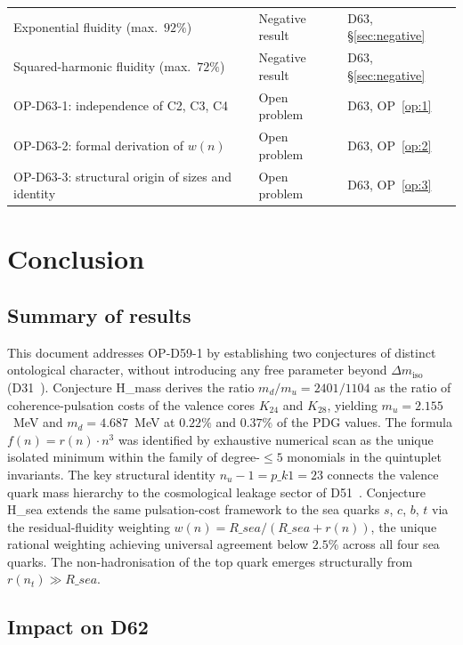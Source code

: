 \documentclass[12pt,a4paper]{article}
\def\Rsea{R\_sea}
\def\pkone{p\_k1}
\theoremstyle{plain}
\theoremstyle{definition}
\theoremstyle{remark}
\newcommand{\nnu}{n_u}
\newcommand{\Rsea}{R_{\mathrm{sea}}}
\newcommand{\pkone}{p_{k_1}}
\newcommand{\Dmiso}{\Delta m_{\mathrm{iso}}}
\newcommand{\mup}{m_u}
\newcommand{\mdown}{m_d}
\begin{document}
\begin{table}[H]
\begin{tabular}{p{7.5cm} p{3.2cm} p{3.5cm}}
Exponential fluidity (max.\ $92\%$) & Negative result & D63, \S\ref{sec:negative} \\
Squared-harmonic fluidity (max.\ $72\%$) & Negative result & D63, \S\ref{sec:negative} \\
OP-D63-1: independence of C2, C3, C4 & Open problem & D63, OP~\ref{op:1} \\
OP-D63-2: formal derivation of $w(n)$ & Open problem & D63, OP~\ref{op:2} \\
OP-D63-3: structural origin of sizes and identity & Open problem & D63, OP~\ref{op:3} \\
\bottomrule
\end{tabular}
\end{table}

\section{Conclusion}
\label{sec:conclusion}

\subsection{Summary of results}

This document addresses OP-D59-1 by establishing two conjectures of distinct ontological character, without introducing any free parameter beyond $\Dmiso$ (D31~\cite{D31}). Conjecture H\_mass derives the ratio $\mdown/\mup = 2401/1104$ as the ratio of coherence-pulsation costs of the valence cores $K_{24}$ and $K_{28}$, yielding $\mup = 2.155$~MeV and $\mdown = 4.687$~MeV at $0.22\%$ and $0.37\%$ of the PDG values. The formula $f(n) = r(n) \cdot n^3$ was identified by exhaustive numerical scan as the unique isolated minimum within the family of degree-$\leq 5$ monomials in the quintuplet invariants. The key structural identity $\nnu - 1 = \pkone = 23$ connects the valence quark mass hierarchy to the cosmological leakage sector of D51~\cite{D51}. Conjecture H\_sea extends the same pulsation-cost framework to the sea quarks $s$, $c$, $b$, $t$ via the residual-fluidity weighting $w(n) = \Rsea/(\Rsea + r(n))$, the unique rational weighting achieving universal agreement below $2.5\%$ across all four sea quarks. The non-hadronisation of the top quark emerges structurally from $r(n_t) \gg \Rsea$.

\subsection{Impact on D62}
\end{document}
